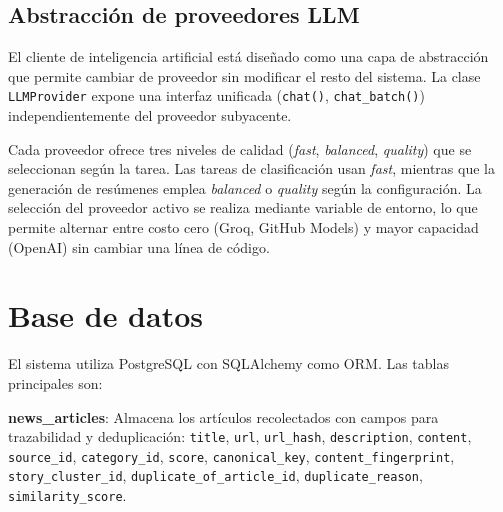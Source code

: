 \subsection{Abstracci\'on de proveedores LLM}

El cliente de inteligencia artificial est\'a dise\~nado como una capa de abstracci\'on que permite cambiar de proveedor sin modificar el resto del sistema. La clase \texttt{LLMProvider} expone una interfaz unificada (\texttt{chat()}, \texttt{chat\_batch()}) independientemente del proveedor subyacente.

\begin{table}[H]
\centering
{}
\caption{Modelos disponibles por proveedor y nivel de calidad}
\end{table}

Cada proveedor ofrece tres niveles de calidad (\textit{fast}, \textit{balanced}, \textit{quality}) que se seleccionan seg\'un la tarea. Las tareas de clasificaci\'on usan \textit{fast}, mientras que la generaci\'on de res\'umenes emplea \textit{balanced} o \textit{quality} seg\'un la configuraci\'on. La selecci\'on del proveedor activo se realiza mediante variable de entorno, lo que permite alternar entre costo cero (Groq, GitHub Models) y mayor capacidad (OpenAI) sin cambiar una l\'inea de c\'odigo.

\section{Base de datos}

El sistema utiliza PostgreSQL con SQLAlchemy como ORM. Las tablas principales son:

\textbf{news\_articles}: Almacena los art\'iculos recolectados con campos para trazabilidad y deduplicaci\'on: \texttt{title}, \texttt{url}, \texttt{url\_hash}, \texttt{description}, \texttt{content}, \texttt{source\_id}, \texttt{category\_id}, \texttt{score}, \texttt{canonical\_key}, \texttt{content\_fingerprint}, \texttt{story\_cluster\_id}, \texttt{duplicate\_of\_article\_id}, \texttt{duplicate\_reason}, \texttt{similarity\_score}.

